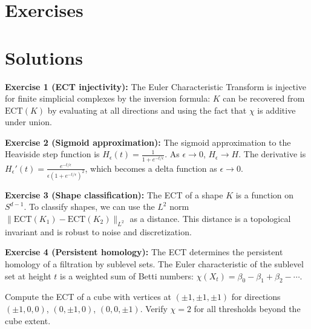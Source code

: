 \section{Exercises}
\section{Solutions}
\label{sec:ect:solutions}

\begin{solution}
\textbf{Exercise 1 (ECT injectivity):} The Euler Characteristic Transform is injective for finite simplicial complexes by the inversion formula: $K$ can be recovered from $\text{ECT}(K)$ by evaluating at all directions and using the fact that $\chi$ is additive under union.
\end{solution}

\begin{solution}
\textbf{Exercise 2 (Sigmoid approximation):} The sigmoid approximation to the Heaviside step function is $H_\epsilon(t) = \frac{1}{1 + e^{-t/\epsilon}}$. As $\epsilon \to 0$, $H_\epsilon \to H$. The derivative is $H_\epsilon'(t) = \frac{e^{-t/\epsilon}}{\epsilon(1+e^{-t/\epsilon})^2}$, which becomes a delta function as $\epsilon \to 0$.
\end{solution}

\begin{solution}
\textbf{Exercise 3 (Shape classification):} The ECT of a shape $K$ is a function on $S^{d-1}$. To classify shapes, we can use the $L^2$ norm $\|\text{ECT}(K_1) - \text{ECT}(K_2)\|_{L^2}$ as a distance. This distance is a topological invariant and is robust to noise and discretization.
\end{solution}

\begin{solution}
\textbf{Exercise 4 (Persistent homology):} The ECT determines the persistent homology of a filtration by sublevel sets. The Euler characteristic of the sublevel set at height $t$ is a weighted sum of Betti numbers: $\chi(X_t) = \beta_0 - \beta_1 + \beta_2 - \cdots$.
\end{solution}

\label{sec:ect:exercises}

\begin{exercise}
Compute the ECT of a cube with vertices at $(\pm 1, \pm 1, \pm 1)$ for directions $(\pm 1,0,0)$, $(0,\pm 1,0)$, $(0,0,\pm 1)$. Verify $\chi = 2$ for all thresholds beyond the cube extent.
\end{exercise}


